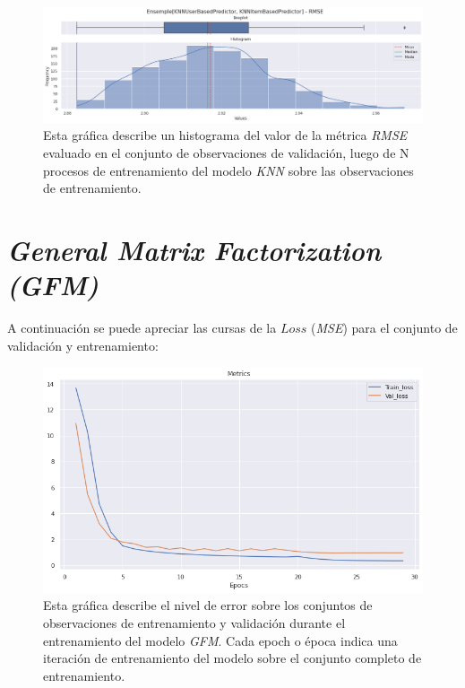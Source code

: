 \documentclass[11pt,a4paper,twoside]{thesis}
\begin{document}
\begin{figure}[!htb]
	\centering
	\includegraphics[width=15cm]{./images/metrics-knn-ensemple-RMSE.png}
	\caption{Esta gráfica describe un histograma del valor de la métrica
		\textit{RMSE} evaluado en el conjunto de observaciones de validación,
		luego de N procesos de entrenamiento del modelo \textit{KNN}
		sobre las observaciones de entrenamiento.}
\end{figure}

\clearpage
\section{\textit{General Matrix Factorization (GFM)}}

A continuación se puede apreciar las cursas de la $Loss$ (\textit{MSE}) para el
conjunto de validación y entrenamiento:

\begin{figure}[ht]
	\centering
	\includegraphics[width=13cm]{./images/metrics-GFM-train-val-loss.png}
	\caption{Esta gráfica describe el nivel de error sobre los conjuntos
		de observaciones de entrenamiento y validación durante el
		entrenamiento del modelo \textit{GFM}. Cada epoch o época indica
		una iteración de entrenamiento del modelo sobre el conjunto completo
		de entrenamiento.}
\end{figure}
\end{document}
